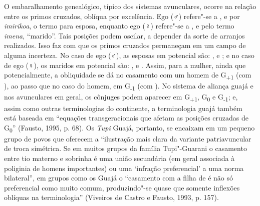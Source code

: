 O embaralhamento genealógico, típico dos sistemas avunculares, ocorre na
relação entre os primos cruzados, oblíqua por excelência. Ego (♂)
refere"-se a ,  e  por \emph{imirikoa}, o termo para esposa,
enquanto ego (♀) refere"-se a ,  e  pelo termo \emph{imena},
``marido''. Tais posições podem oscilar, a depender da sorte de arranjos
realizados. Isso faz com que os primos cruzados permaneçam em um campo
de alguma incerteza. No caso de ego (♂), as esposas em potencial são:
,  e ; e no caso de ego (♀), os maridos em potencial são: ,
 e . Assim, para a mulher, ainda que potencialmente, a obliquidade
se dá no casamento com um homem de G\textsubscript{+1} (com ), ao
passo que no caso do homem, em G\textsubscript{-1} (com ). No sistema
de aliança guajá e nos avunculares em geral, os cônjuges podem aparecer
em G\textsubscript{+1}, G\textsubscript{0} e G\textsubscript{-1}; e,
assim como outras terminologias do continente, a terminologia guajá
também está baseada em ``equações transgeracionais que afetam as
posições cruzadas de G\textsubscript{0}'' (Fausto, 1995, p. 68). Os
\emph{Tupi} Guajá, portanto, se encaixam em um pequeno grupo de povos
que oferecem a ``ilustração mais clara da variante patriavuncular de
troca simétrica. Se em muitos grupos da família Tupi"-Guarani o casamento
entre tio materno e sobrinha é uma união secundária (em geral associada
à poliginia de homens importantes) ou uma `infração preferencial' a uma
norma bilateral'', em grupos como os Guajá o ``casamento com a filha de 
é não só preferencial como muito comum, produzindo"-se quase que somente
inflexões oblíquas na terminologia'' (Viveiros de Castro e Fausto, 1993,
p. 157).

